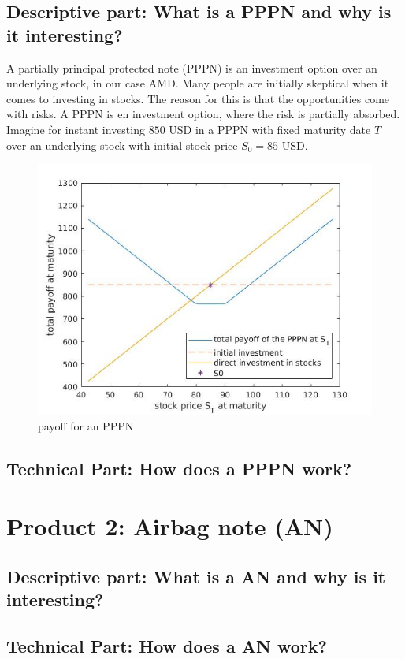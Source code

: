 \documentclass[11pt,oneside,a4paper]{article}
\makeatletter
\def\cleardoublepage{\clearpage\if@twoside \ifodd\c@page\else%
	\hbox{}%
	\thispagestyle{empty}%
	\clearpage%
	\if@twocolumn\hbox{}\clearpage\fi\fi\fi}
\makeatother
\begin{document}
	\subsection{Descriptive part: What is a PPPN and why is it interesting?}
	A partially principal protected note (PPPN) is an investment option over an underlying stock, in our case AMD. Many people are initially skeptical when it comes to investing in stocks. The reason for this is that the opportunities come with risks. A PPPN is en investment option, where the risk is partially absorbed. Imagine for instant investing $850 \text{ USD}$ in a PPPN with fixed maturity date $ T $ over an underlying stock with initial stock price $ S_0 = 85 \text{ USD} $.
	\begin{figure}[H]
		\centering
		\includegraphics[width=0.8\linewidth]{payoff_PPPN.jpg}
		 \caption{payoff for an PPPN}
	\end{figure} 
	
	\subsection{Technical Part: How does a PPPN work?}
	\newpage
	\section{Product 2: Airbag note (AN)}
	\subsection{Descriptive part: What is a AN and why is it interesting?}
	\subsection{Technical Part: How does a AN work?}
	\cleardoublepage
\end{document}
